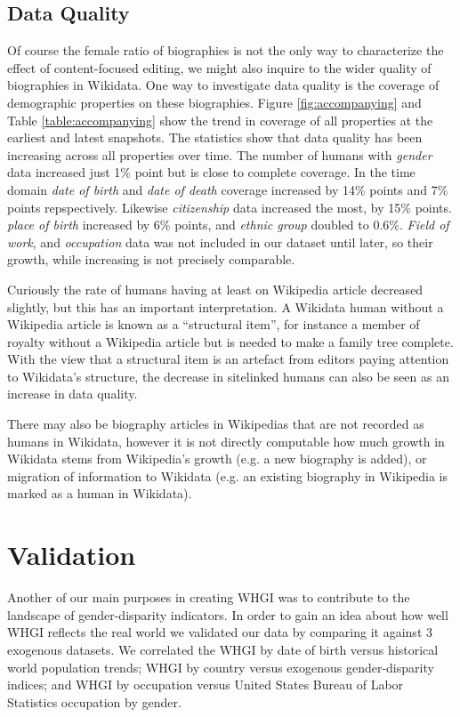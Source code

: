 \documentclass{sig-alternate-05-2015}
\begin{document}
\subsection{Data Quality}
Of course the female ratio of biographies is not the only way to characterize the effect of content-focused editing, we might also inquire to the wider quality of biographies in Wikidata. One way to investigate data quality is the coverage of demographic  properties on these biographies. Figure \ref{fig:accompanying} and Table \ref{table:accompanying} show the trend in coverage of all properties at the earliest and latest snapshots. The statistics show that data quality has been increasing across all properties over time. The number of humans with \textit{gender} data increased just 1\% point but is close to complete coverage. In the time domain \textit{date of birth} and \textit{date of death} coverage increased by 14\% points and 7\% points repspectively. Likewise \textit{citizenship} data increased the most, by 15\% points. \textit{place of birth} increased by 6\% points, and \textit{ethnic group} doubled to 0.6\%. \textit{Field of work}, and \textit{occupation} data was not included in our dataset until later, so their growth, while increasing is not precisely comparable.


Curiously the rate of humans having at least on Wikipedia article decreased slightly, but this has an important interpretation. A Wikidata human without a Wikipedia article is known as a ``structural item'', for instance a member of royalty without a Wikipedia article but is needed to make a family tree complete. With the view that a structural item is an artefact from editors paying attention to Wikidata's structure, the decrease in sitelinked humans can also be seen as an increase in data quality. 

There may also be biography articles in Wikipedias that are not recorded as humans in Wikidata, however it is not directly computable how much growth in Wikidata stems from Wikipedia's growth (e.g. a new biography is added), or migration of information to Wikidata (e.g. an existing biography in Wikipedia is marked as a human in Wikidata).


\section{Validation}
Another of our main purposes in creating WHGI was to contribute to the landscape of gender-disparity indicators. In order to gain an idea about how well WHGI reflects the real world we validated our data by comparing it against 3 exogenous datasets. We correlated the WHGI by date of birth versus historical world population trends; WHGI by country versus exogenous gender-disparity indices; and WHGI by occupation versus United States Bureau of Labor Statistics occupation by gender.
\end{document}
